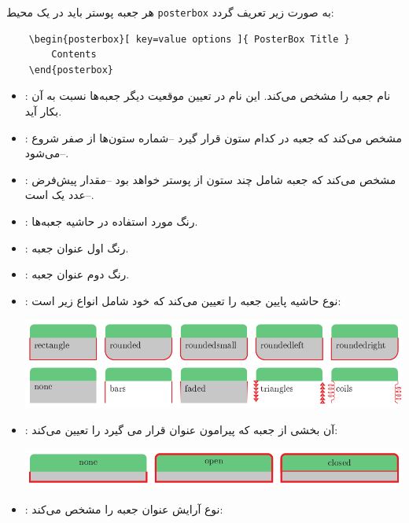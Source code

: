 \documentclass[debug,a0paper]{xebaposter}
\begin{document}
\begin{poster}
\begin{posterbox}[name=posterboxoption,column=1,span=2,below=posteroption,textborder=none
,headershape=rectangle,headerborder=none,textborder=coils,headershade=shadetbinverse]
    هر جعبه پوستر باید در یک محیط \texttt{posterbox} به صورت زیر تعریف گردد:
\begin{latin}
\vspace{-3mm}
\begin{verbatim}
    \begin{posterbox}[ key=value options ]{ PosterBox Title }
        Contents
    \end{posterbox}
\end{verbatim}
\end{latin}
\begin{itemize}
    \item {}: نام جعبه را مشخص می‌کند. این نام در تعیین موقعیت دیگر جعبه‌ها نسبت به آن بکار آید.
    \item {}: مشخص می‌کند که جعبه در کدام ستون قرار گیرد 
    --شماره ستون‌ها از صفر شروع می‌شود--.
    \item {}:    
    مشخص می‌کند که جعبه شامل چند ستون از پوستر خواهد بود --مقدار پیش‌فرض عدد یک است--. 
    \item {}:
    رنگ مورد استفاده در حاشیه جعبه‌ها. 
    \item {}:
    رنگ اول عنوان جعبه.
    \item {}:
    رنگ دوم عنوان جعبه.
    \item {}:
    نوع حاشیه پایین جعبه را تعیین می‌کند که خود شامل انواع زیر است:
    
    \centerline{\includegraphics[scale=0.7]{docs-boxshape}}
    \item {}:
    آن بخشی از جعبه که پیرامون عنوان قرار می گیرد را تعیین می‌کند:
    
    \centerline{\includegraphics[scale=0.7]{docs-headerborder}}
    \item {}:
    نوع آرایش عنوان جعبه را مشخص می‌کند:
    

\end{itemize}
\end{posterbox}
\end{poster}
\end{document}
